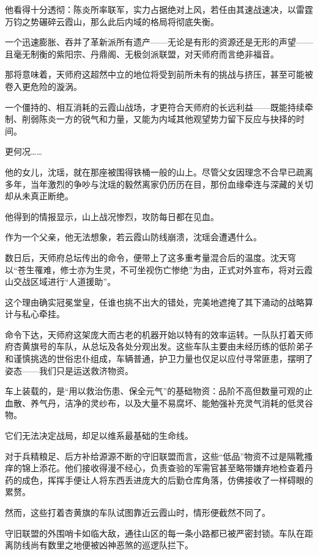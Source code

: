 他看得十分透彻：陈炎所率联军，实力占据绝对上风，若任由其速战速决，以雷霆万钧之势碾碎云霞山，那么此后内域的格局将彻底失衡。

一个迅速膨胀、吞并了革新派所有遗产——无论是有形的资源还是无形的声望——且毫无制衡的紫阳宗、丹鼎阁、无极剑派联盟，对天师府而言绝非福音。

那将意味着，天师府这超然中立的地位将受到前所未有的挑战与挤压，甚至可能被卷入更危险的漩涡。

一个僵持的、相互消耗的云霞山战场，才更符合天师府的长远利益——既能持续牵制、削弱陈炎一方的锐气和力量，又能为内域其他观望势力留下反应与抉择的时间。

更何况……

他的女儿，沈瑶，就在那座被围得铁桶一般的山上。尽管父女因理念不合早已疏离多年，当年激烈的争吵与沈瑶的毅然离家仍历历在目，那份血缘牵连与深藏的关切却从未真正断绝。

他得到的情报显示，山上战况惨烈，攻防每日都在见血。

作为一个父亲，他无法想象，若云霞山防线崩溃，沈瑶会遭遇什么。

\vspace{2em}

数日后，天师府总坛传出的命令，便带上了这多重考量混合后的温度。沈天穹以“苍生罹难，修士亦为生灵，不可坐视伤亡惨绝”为由，正式对外宣布，将对云霞山交战区域进行“人道援助”。

这个理由确实冠冕堂皇，任谁也挑不出大的错处，完美地遮掩了其下涌动的战略算计与私心牵挂。

命令下达，天师府这架庞大而古老的机器开始以特有的效率运转。一队队打着天师府杏黄旗号的车队，从总坛及各处分观出发。这些车队主要由未经历练的低阶弟子和谨慎挑选的世俗忠仆组成，车辆普通，护卫力量也仅足以应付寻常匪患，摆明了姿态——我们只是运送救济物资。

车上装载的，是“用以救治伤患、保全元气”的基础物资：品阶不高但数量可观的止血散、养气丹，洁净的灵纱布，以及大量不易腐坏、能勉强补充灵气消耗的低灵谷物。

它们无法决定战局，却足以维系最基础的生命线。

对于兵精粮足、后方补给源源不断的守旧联盟而言，这些“低品”物资不过是隔靴搔痒的锦上添花。他们接收得漫不经心，负责查验的军需官甚至略带嫌弃地检查着丹药的成色，挥挥手便让人将东西丢进庞大的后勤仓库角落，仿佛接收了一样碍眼的累赘。

然而，这些打着杏黄旗的车队试图靠近云霞山时，情形便截然不同了。

守旧联盟的外围哨卡如临大敌，通往山区的每一条小路都已被严密封锁。车队在距离防线尚有数里之地便被凶神恶煞的巡逻队拦下。

